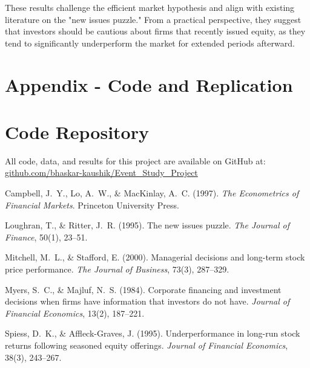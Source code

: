 \documentclass[12pt]{article}
\begin{document}
These results challenge the efficient market hypothesis and align with existing literature on the "new issues puzzle." From a practical perspective, they suggest that investors should be cautious about firms that recently issued equity, as they tend to significantly underperform the market for extended periods afterward.

\section{Appendix - Code and Replication}
\section*{Code Repository}
All code, data, and results for this project are available on GitHub at: 
\href{https://github.com/bhaskar-kaushik/Event_Study_Project}{github.com/bhaskar-kaushik/Event\_Study\_Project}

\begin{thebibliography}{99}

Campbell, J.~Y., Lo, A.~W., \& MacKinlay, A.~C. (1997).
\newblock \emph{The Econometrics of Financial Markets}.
\newblock Princeton University Press.

Loughran, T., \& Ritter, J.~R. (1995).
\newblock The new issues puzzle.
\newblock \emph{The Journal of Finance}, 50(1), 23--51.

Mitchell, M.~L., \& Stafford, E. (2000).
\newblock Managerial decisions and long-term stock price performance.
\newblock \emph{The Journal of Business}, 73(3), 287--329.

Myers, S.~C., \& Majluf, N.~S. (1984).
\newblock Corporate financing and investment decisions when firms have information that investors do not have.
\newblock \emph{Journal of Financial Economics}, 13(2), 187--221.

Spiess, D.~K., \& Affleck-Graves, J. (1995).
\newblock Underperformance in long-run stock returns following seasoned equity offerings.
\newblock \emph{Journal of Financial Economics}, 38(3), 243--267.

\end{thebibliography}
\end{document}
